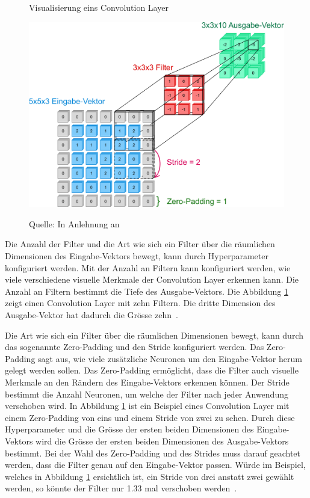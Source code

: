 \begin{figure}[h!]
    \captionsetup{width=.9\linewidth}
    \caption{Visualisierung eins Convolution Layer}
    \label{fig:conv:vis}
    \centering
    \includegraphics[scale=0.5]{graphics/cnn-visual.pdf}\\
    \caption*{Quelle: In Anlehnung an \textcite{CNN}}
    \vspace*{0.5cm}
\end{figure}

Die Anzahl der Filter und die Art wie sich ein Filter über die räumlichen Dimensionen des Eingabe-Vektors bewegt, kann durch Hyperparameter konfiguriert werden. Mit der Anzahl an Filtern kann konfiguriert werden, wie viele verschiedene visuelle Merkmale der Convolution Layer erkennen kann. Die Anzahl an Filtern bestimmt die Tiefe des Ausgabe-Vektors. Die Abbildung \ref{fig:conv:vis} zeigt einen Convolution Layer mit zehn Filtern. Die dritte Dimension des Ausgabe-Vektor hat dadurch die Grösse zehn~\autocite{CNN}.

Die Art wie sich ein Filter über die räumlichen Dimensionen bewegt, kann durch das sogenannte Zero-Padding und den Stride konfiguriert werden. Das Zero-Padding sagt aus, wie viele zusätzliche Neuronen um den Eingabe-Vektor herum gelegt werden sollen. Das Zero-Padding ermöglicht, dass die Filter auch visuelle Merkmale an den Rändern des Eingabe-Vektors erkennen können. Der Stride bestimmt die Anzahl Neuronen, um welche der Filter nach jeder Anwendung verschoben wird. In Abbildung \ref{fig:conv:vis} ist ein Beispiel eines Convolution Layer mit einem Zero-Padding von eins und einem Stride von zwei zu sehen. Durch diese Hyperparameter und die Grösse der ersten beiden Dimensionen des Eingabe-Vektors wird die Grösse der ersten beiden Dimensionen des Ausgabe-Vektors bestimmt. Bei der Wahl des Zero-Padding und des Strides muss darauf geachtet werden, dass die Filter genau auf den Eingabe-Vektor passen. Würde im Beispiel, welches in Abbildung \ref{fig:conv:vis} ersichtlich ist, ein Stride von drei anstatt zwei gewählt werden, so könnte der Filter nur 1.33 mal verschoben werden~\autocite{CNN}.

